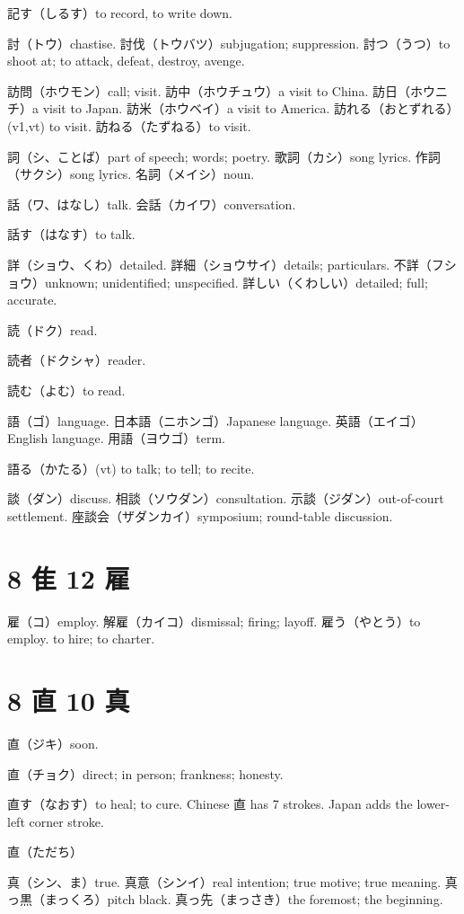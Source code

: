 記す（しるす）to record, to write down.

討（トウ）chastise.
討伐（トウバツ）subjugation; suppression.
討つ（うつ）to shoot at; to attack, defeat, destroy, avenge.

訪問（ホウモン）call; visit.
訪中（ホウチュウ）a visit to China.
訪日（ホウニチ）a visit to Japan.
訪米（ホウベイ）a visit to America.
訪れる（おとずれる）(v1,vt) to visit.
訪ねる（たずねる）to visit.

詞（シ、ことば）part of speech; words; poetry.
歌詞（カシ）song lyrics.
作詞（サクシ）song lyrics.
名詞（メイシ）noun.

話（ワ、はなし）talk.
会話（カイワ）conversation.

話す（はなす）to talk.

詳（ショウ、くわ）detailed.
詳細（ショウサイ）details; particulars.
不詳（フショウ）unknown; unidentified; unspecified.
詳しい（くわしい）detailed; full; accurate.

読（ドク）read.

読者（ドクシャ）reader.

読む（よむ）to read.

語（ゴ）language.
日本語（ニホンゴ）Japanese language.
英語（エイゴ）English language.
用語（ヨウゴ）term.

語る（かたる）(vt) to talk; to tell; to recite.

談（ダン）discuss.
相談（ソウダン）consultation.
示談（ジダン）out-of-court settlement.
座談会（ザダンカイ）symposium; round-table discussion.

\section{8 隹 12 雇}

雇（コ）employ.
解雇（カイコ）dismissal; firing; layoff.
雇う（やとう）to employ. to hire; to charter.

\section{8 直 10 真}

直（ジキ）soon.

直（チョク）direct; in person; frankness; honesty.

直す（なおす）to heal; to cure.
Chinese 直 has 7 strokes.
Japan adds the lower-left corner stroke.

直（ただち）

真（シン、ま）true.
真意（シンイ）real intention; true motive; true meaning.
真っ黒（まっくろ）pitch black.
真っ先（まっさき）the foremost; the beginning.

